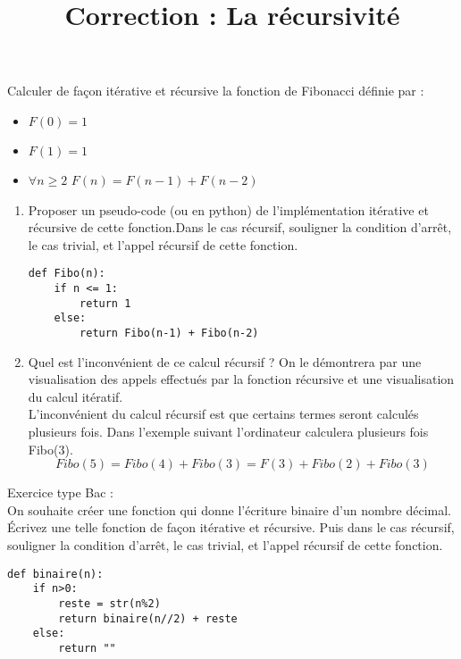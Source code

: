 \documentclass[12pt,fleqn]{article} %
\date{}
\begin{document}
\title{Correction :  La récursivité}
\maketitle

\begin{exercise}
	Calculer de façon itérative et récursive la fonction de Fibonacci définie par : \begin{itemize}
		\item $F(0)=1$
		\item $F(1)= 1$
		\item $\forall n \geq 2$ $F(n) = F(n-1) + F(n - 2)$
	\end{itemize}

\begin{enumerate}
	\item Proposer un pseudo-code (ou en python) de l'implémentation itérative et récursive de cette fonction.Dans le cas récursif, souligner la condition d'arrêt, le cas trivial, et l'appel récursif de cette fonction.
	
	\begin{center}
		\begin{varwidth}[t]{.5\textwidth}
			\begin{lstlisting}[language=iPython,linewidth = 13cm]
def Fibo(n):
	if n <= 1:
		return 1
	else:
		return Fibo(n-1) + Fibo(n-2)
	\end{lstlisting}\end{varwidth}\end{center}
	
	\item Quel est l'inconvénient de ce calcul récursif ? On le démontrera par une visualisation des appels effectués par la fonction récursive et une visualisation du calcul itératif. \\
	L'inconvénient du calcul récursif est que certains termes seront calculés plusieurs fois. Dans l'exemple suivant l'ordinateur calculera plusieurs fois Fibo(3). 
	\[
	Fibo(5) = Fibo(4) + Fibo(3) = F(3) + Fibo(2) + Fibo(3)
	\]
\end{enumerate}
\end{exercise}




\begin{exercise}
	Exercice type Bac : \\
	On souhaite créer une fonction qui donne l'écriture binaire d'un nombre décimal. Écrivez une telle fonction de façon itérative et récursive. Puis dans le cas récursif, souligner la condition d'arrêt, le cas trivial, et l'appel récursif de cette fonction.
		\begin{center}
		\begin{varwidth}[t]{.5\textwidth}
			\begin{lstlisting}[language=iPython,linewidth = 13cm]
def binaire(n):
	if n>0:
		reste = str(n%2)
		return binaire(n//2) + reste
	else:
		return ""
	\end{lstlisting}\end{varwidth}\end{center}
\end{exercise}
\end{document}
